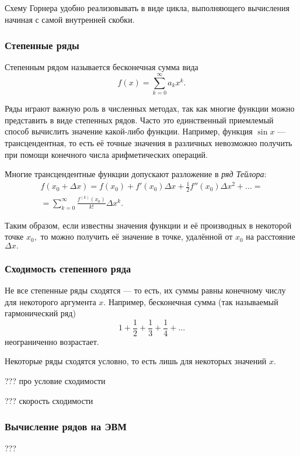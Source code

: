 Схему Горнера удобно реализовывать в виде цикла, выполняющего вычисления
начиная с самой внутренней скобки.


\subsubsection{Степенные ряды}

Степенным рядом называется бесконечная сумма вида
\[
f(x)=\sum_{k=0}^{\infty}a_{k}x^{k}.
\]


Ряды играют важную роль в численных методах, так как многие функции
можно представить в виде степенных рядов. Часто это единственный приемлемый
способ вычислить значение какой-либо функции. Например, функция $\sin x$
— трансцендентная, то есть её точные значения в различных невозможно
получить при помощи конечного числа арифметических операций.

Многие трансцендентные функции допускают разложение в \emph{ряд Тейлора}:
\begin{multline*}
f(x_{0}+\Delta x)=f(x_{0})+f'(x_{0})\Delta x+\frac{1}{2}f''(x_{0})\Delta x^{2}+\ldots=\\
=\sum_{k=0}^{\infty}\frac{f^{(k)}(x_{0})}{k!}\Delta x^{k}.
\end{multline*}


Таким образом, если известны значения функции и её производных в некоторой
точке $x_{0},$ то можно получить её значение в точке, удалённой от
$x_{0}$ на расстояние $\Delta x.$


\subsubsection{Сходимость степенного ряда}

Не все степенные ряды сходятся — то есть, их суммы равны конечному
числу для некоторого аргумента $x$. Например, бесконечная сумма (так
называемый гармонический ряд) 
\[
1+\frac{1}{2}+\frac{1}{3}+\frac{1}{4}+\dots
\]
неограниченно возрастает.

Некоторые ряды сходятся условно, то есть лишь для некоторых значений
$x$. 

??? про условие сходимости

??? скорость сходимости


\subsubsection{Вычисление рядов на ЭВМ}

???

